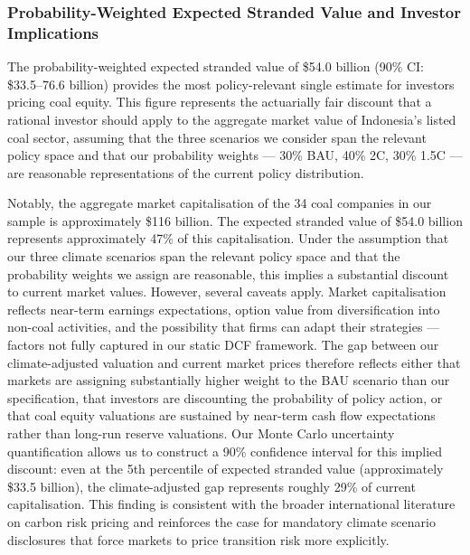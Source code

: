 \subsubsection{Probability-Weighted Expected Stranded Value and Investor Implications}

The probability-weighted expected stranded value of \$54.0 billion (90\% CI: \$33.5--76.6 billion) provides the most policy-relevant single estimate for investors pricing coal equity. This figure represents the actuarially fair discount that a rational investor should apply to the aggregate market value of Indonesia's listed coal sector, assuming that the three scenarios we consider span the relevant policy space and that our probability weights --- 30\% BAU, 40\% 2\textdegree C, 30\% 1.5\textdegree C --- are reasonable representations of the current policy distribution.

Notably, the aggregate market capitalisation of the 34 coal companies in our sample is approximately \$116 billion. The expected stranded value of \$54.0 billion represents approximately 47\% of this capitalisation. Under the assumption that our three climate scenarios span the relevant policy space and that the probability weights we assign are reasonable, this implies a substantial discount to current market values. However, several caveats apply. Market capitalisation reflects near-term earnings expectations, option value from diversification into non-coal activities, and the possibility that firms can adapt their strategies --- factors not fully captured in our static DCF framework. The gap between our climate-adjusted valuation and current market prices therefore reflects either that markets are assigning substantially higher weight to the BAU scenario than our specification, that investors are discounting the probability of policy action, or that coal equity valuations are sustained by near-term cash flow expectations rather than long-run reserve valuations. Our Monte Carlo uncertainty quantification allows us to construct a 90\% confidence interval for this implied discount: even at the 5th percentile of expected stranded value (approximately \$33.5 billion), the climate-adjusted gap represents roughly 29\% of current capitalisation. This finding is consistent with the broader international literature on carbon risk pricing \citep{BoltonKacperczyk2021} and reinforces the case for mandatory climate scenario disclosures that force markets to price transition risk more explicitly.

